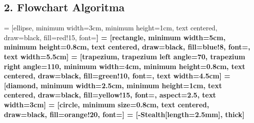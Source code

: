 \documentclass[11pt,a4paper]{article}
\begin{document}
\subsection*{2. Flowchart Algoritma}

 = [ellipse, minimum width=3cm, minimum height=1cm, text centered, draw=black, fill=red!15, font=\footnotesize\bfseries]
 = [rectangle, minimum width=5cm, minimum height=0.8cm, text centered, draw=black, fill=blue!8, font=\footnotesize, text width=5.5cm]
 = [trapezium, trapezium left angle=70, trapezium right angle=110, minimum width=4cm, minimum height=0.8cm, text centered, draw=black, fill=green!10, font=\footnotesize, text width=4.5cm]
 = [diamond, minimum width=2.5cm, minimum height=1cm, text centered, draw=black, fill=yellow!15, font=\footnotesize, aspect=2.5, text width=3cm]
 = [circle, minimum size=0.8cm, text centered, draw=black, fill=orange!20, font=\footnotesize\bfseries]
 = [-{Stealth[length=2.5mm]}, thick]
\end{document}
